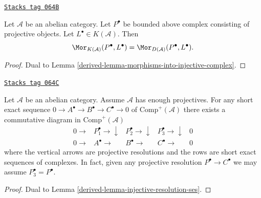 \begin{lemma}
\label{derived-lemma-morphisms-from-projective-complex}
\href{https://stacks.math.columbia.edu/tag/064B}{\texttt{Stacks tag 064B}}

Let $\mathcal{A}$ be an abelian category.
Let $P^\bullet$ be bounded above complex consisting of projective
objects. Let $L^\bullet \in K(\mathcal{A})$. Then
$$
\Mor_{K(\mathcal{A})}(P^\bullet, L^\bullet)
=
\Mor_{D(\mathcal{A})}(P^\bullet, L^\bullet).
$$
\end{lemma}

\begin{proof}

Dual to
Lemma \ref{derived-lemma-morphisms-into-injective-complex}.
\end{proof}

\begin{lemma}
\label{derived-lemma-projective-resolution-ses}
\href{https://stacks.math.columbia.edu/tag/064C}{\texttt{Stacks tag 064C}}

Let $\mathcal{A}$ be an abelian category.
Assume $\mathcal{A}$ has enough projectives.
For any short exact sequence
$0 \to A^\bullet \to B^\bullet \to C^\bullet \to 0$
of $\text{Comp}^{+}(\mathcal{A})$ there exists a
commutative diagram in $\text{Comp}^{+}(\mathcal{A})$
$$
\begin{array}{ccccc}0 \longrightarrow & P_1^\bullet \longrightarrow\downarrow & P_2^\bullet \longrightarrow\downarrow & P_3^\bullet \longrightarrow\downarrow & 0 \\ 0 \longrightarrow & A^\bullet \longrightarrow & B^\bullet \longrightarrow & C^\bullet \longrightarrow & 0\end{array}
$$
where the vertical arrows are projective resolutions and
the rows are short exact sequences of complexes.
In fact, given any projective resolution $P^\bullet \to C^\bullet$
we may assume $P_3^\bullet = P^\bullet$.
\end{lemma}

\begin{proof}

Dual to
Lemma \ref{derived-lemma-injective-resolution-ses}.
\end{proof}

